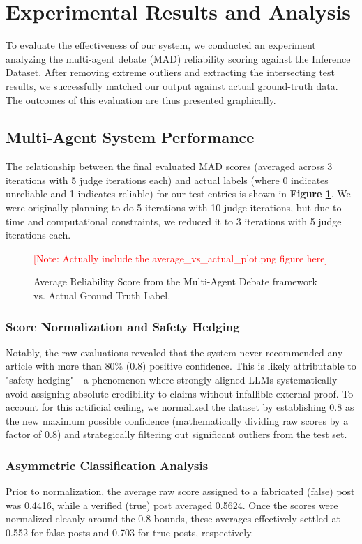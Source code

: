 \section{Experimental Results and Analysis}\label{sec:results}
To evaluate the effectiveness of our system, we conducted an experiment analyzing the multi-agent debate (MAD) reliability scoring against the Inference Dataset. After removing extreme outliers and extracting the intersecting test results, we successfully matched our output against actual ground-truth data. The outcomes of this evaluation are thus presented graphically.

\subsection{Multi-Agent System Performance}
The relationship between the final evaluated MAD scores (averaged across 3 iterations with 5 judge iterations each) and actual labels (where 0 indicates unreliable and 1 indicates reliable) for our test entries is shown in \textbf{Figure \ref{fig:mad_scores}}. We were originally planning to do 5 iterations with 10 judge iterations, but due to time and computational constraints, we reduced it to 3 iterations with 5 judge iterations each.

\begin{figure}[h]
    \centering
    \textcolor{red}{[Note: Actually include the average\_vs\_actual\_plot.png figure here]}
    \caption{Average Reliability Score from the Multi-Agent Debate framework vs. Actual Ground Truth Label.}
    \label{fig:mad_scores}
\end{figure}

\subsubsection*{Score Normalization and Safety Hedging}
Notably, the raw evaluations revealed that the system never recommended any article with more than 80\% (0.8) positive confidence. This is likely attributable to "safety hedging"—a phenomenon where strongly aligned LLMs systematically avoid assigning absolute credibility to claims without infallible external proof. To account for this artificial ceiling, we normalized the dataset by establishing 0.8 as the new maximum possible confidence (mathematically dividing raw scores by a factor of 0.8) and strategically filtering out significant outliers from the test set.

\subsubsection*{Asymmetric Classification Analysis}
Prior to normalization, the average raw score assigned to a fabricated (false) post was 0.4416, while a verified (true) post averaged 0.5624. Once the scores were normalized cleanly around the 0.8 bounds, these averages effectively settled at 0.552 for false posts and 0.703 for true posts, respectively.

